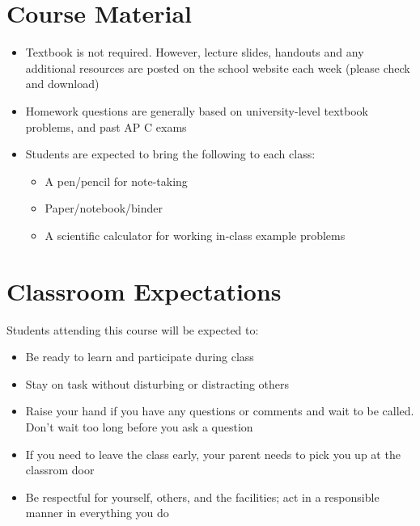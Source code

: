 \documentclass{../../oss-handout}
\begin{document}
\section*{Course Material}
\begin{itemize}[topsep=0pt,noitemsep,leftmargin=18pt]
\item Textbook is not required. However, lecture slides, handouts and any
  additional resources are posted on the school website each week (please check
  and download)
\item Homework questions are generally based on university-level textbook
  problems, and past AP C exams
\item Students are expected to bring the following to each class:
  \begin{itemize}[noitemsep,topsep=0pt]
  \item A pen/pencil for note-taking
  \item Paper/notebook/binder
  \item A scientific calculator for working in-class example problems
  \end{itemize}
\end{itemize}


\section*{Classroom Expectations}
Students attending this course will be expected to:
\begin{itemize}[noitemsep,topsep=0pt,leftmargin=18pt]
\item Be ready to learn and participate during class
\item Stay on task without disturbing or distracting others
\item Raise your hand if you have any questions or comments and wait to be
  called. Don't wait too long before you ask a question
\item If you need to leave the class early, your parent needs to pick you up at
  the classrom door
\item Be respectful for yourself, others, and the facilities; act in a
  responsible manner in everything you do
\end{itemize}
\end{document}
